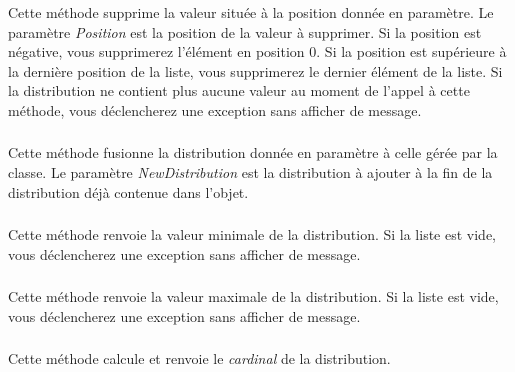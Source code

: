 \noindent Cette méthode supprime la valeur située à la position donnée en paramètre.
Le paramètre \textit{Position} est la position de la valeur à supprimer.
Si la position est négative, vous supprimerez l'élément en position $ 0 $.
Si la position est supérieure à la dernière position de la liste, vous supprimerez le dernier élément de la liste.
Si la distribution ne contient plus aucune valeur au moment de l'appel à cette méthode, vous déclencherez une exception  sans afficher de message.


\subsubsection*{}

\noindent Cette méthode fusionne la distribution donnée en paramètre à celle gérée par la classe.
Le paramètre \textit{NewDistribution} est la distribution à ajouter à la fin de la distribution déjà contenue dans l'objet.



\subsubsection*{}

\noindent Cette méthode renvoie la valeur minimale de la distribution.
Si la liste est vide, vous déclencherez une exception  sans afficher de message.


\subsubsection*{}

\noindent Cette méthode renvoie la valeur maximale de la distribution.
Si la liste est vide, vous déclencherez une exception  sans afficher de message.


\subsubsection*{}

\noindent Cette méthode calcule et renvoie le \textit{cardinal} de la distribution.


\subsubsection*{}

